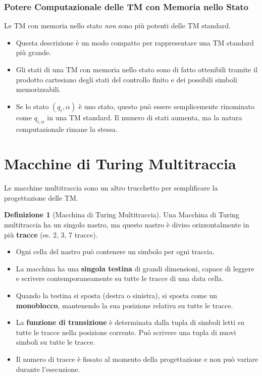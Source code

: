 \documentclass[a4paper]{article}
\theoremstyle{definition} %
\newtheorem{definition}{Definizione}
\begin{document}
\subsubsection{Potere Computazionale delle TM con Memoria nello Stato}
Le TM con memoria nello stato \emph{non} sono più potenti delle TM standard.
\begin{itemize}
    \item Questa descrizione è un modo compatto per rappresentare una TM standard più grande.
    \item Gli stati di una TM con memoria nello stato sono di fatto ottenibili tramite il prodotto cartesiano degli stati del controllo finito e dei possibili simboli memorizzabili.
    \item Se lo stato $(q_i, \alpha)$ è uno stato, questo può essere semplicemente rinominato come $q_{i,\alpha}$ in una TM standard. Il numero di stati aumenta, ma la natura computazionale rimane la stessa.
\end{itemize}

\section{Macchine di Turing Multitraccia}
Le macchine multitraccia sono un altro trucchetto per semplificare la progettazione delle TM.

\begin{definition}[Macchina di Turing Multitraccia]
Una Macchina di Turing multitraccia ha un singolo nastro, ma questo nastro è diviso orizzontalmente in più \textbf{tracce} (es. 2, 3, 7 tracce).
\begin{itemize}
    \item Ogni cella del nastro può contenere un simbolo per ogni traccia.
    \item La macchina ha una \textbf{singola testina} di grandi dimensioni, capace di leggere e scrivere contemporaneamente su tutte le tracce di una data cella.
    \item Quando la testina si sposta (destra o sinistra), si sposta come un \textbf{monoblocco}, mantenendo la sua posizione relativa su tutte le tracce.
    \item La \textbf{funzione di transizione} è determinata dalla tupla di simboli letti su tutte le tracce nella posizione corrente. Può scrivere una tupla di nuovi simboli su tutte le tracce.
    \item Il numero di tracce è fissato al momento della progettazione e non può variare durante l'esecuzione.
\end{itemize}
\end{definition}
\end{document}
